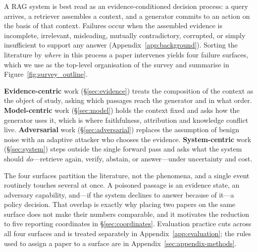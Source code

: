 A RAG system is best read as an evidence-conditioned decision process: a query arrives, a
retriever assembles a context, and a generator commits to an action on the basis of that
context. Failures occur when the assembled evidence is incomplete, irrelevant, misleading,
mutually contradictory, corrupted, or simply insufficient to support any answer
(Appendix~\ref{app:background}). Sorting the literature by \emph{where} in this process a
paper intervenes yields four failure surfaces, which we use as the top-level organisation of
the survey and summarise in Figure~\ref{fig:survey_outline}.

\textbf{Evidence-centric} work (\S\ref{sec:evidence}) treats the composition of the context
as the object of study, asking which passages reach the generator and in what order.
\textbf{Model-centric} work (\S\ref{sec:model}) holds the context fixed and asks how the
generator uses it, which is where faithfulness, attribution and knowledge conflict live.
\textbf{Adversarial} work (\S\ref{sec:adversarial}) replaces the assumption of benign noise
with an adaptive attacker who chooses the evidence. \textbf{System-centric} work
(\S\ref{sec:system}) steps outside the single forward pass and asks what the system should
\emph{do}---retrieve again, verify, abstain, or answer---under uncertainty and cost.

The four surfaces partition the literature, not the phenomena, and a single event routinely
touches several at once. A poisoned passage is an evidence state, an adversary capability,
and---if the system declines to answer because of it---a policy decision. That overlap is
exactly why placing two papers on the same surface does not make their numbers comparable,
and it motivates the reduction to five reporting coordinates in \S\ref{sec:coordinates}.
Evaluation practice cuts across all four surfaces and is treated separately in
Appendix~\ref{app:evaluation}; the rules used to assign a paper to a surface are in
Appendix~\ref{sec:appendix-methods}.
